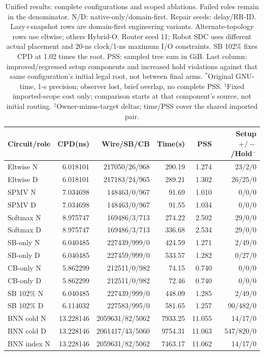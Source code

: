 \documentclass[conference,10pt]{IEEEtran}
\begin{document}
\begin{table}[t]
\centering\footnotesize\setlength{\tabcolsep}{3 pt}
\caption{Unified results: complete configurations and scoped ablations. Failed roles remain in the denominator. N/D: native-only/domain-first. Repair seeds: delay/RR-ID. Lazy+snapshot rows are domain-first engineering variants. Alternate-topology rows use eltwise; others Hybrid-O. Router seed 11; Robot SDC uses different actual placement and 20-ns clock/1-ns maximum I/O constraints. SB 102\% fixes CPD at 1.02 times the root. PSS: sampled tree sum in GiB. Last column: improved/regressed setup components and increased hold violations against that same configuration's initial legal root, not between final arms. $^{*}$Original GNU-time, 1-s precision; observer lost, brief overlap, no complete PSS. $^{\dagger}$Fixed imported-scope cost only; comparison starts at that component's source, not initial routing. $^{\ddagger}$Owner-minus-target deltas; time/PSS cover the shared imported pair.}
\label{tab:completecost}
\begin{tabular}{lrrrrr}\hline
Circuit/role & CPD(ns) & Wire/SB/CB & Time(s) & PSS & Setup $+/-$/Hold$^-$\\\hline
Eltwise N&6.018101&217050/26/968&290.19&1.274&23/2/0\\
Eltwise D&6.018101&217183/24/965&289.21&1.302&26/25/0\\
SPMV N&7.034698&148463/0/967&91.69&1.010&0/0/0\\
SPMV D&7.034698&148463/0/967&91.55&1.034&0/0/0\\
Softmax N&8.975747&169486/3/713&274.22&2.502&29/0/0\\
Softmax D&8.975747&169486/3/713&336.68&2.534&29/0/0\\
SB-only N&6.040485&227439/999/0&424.59&1.271&2/49/0\\
SB-only D&6.040485&227459/999/0&533.57&1.282&0/27/0\\
CB-only N&5.862299&212511/0/982&74.15&0.740&0/0/0\\
CB-only D&5.862299&212511/0/982&72.46&0.740&0/0/0\\
SB 102\% N&6.040485&227439/999/0&448.09&1.285&2/49/0\\
SB 102\% D&6.114032&227583/995/0&581.65&1.257&90/482/0\\
BNN cold N&13.228146&2059631/82/5062&7933.25&11.055&14/17/0\\
BNN cold D&13.228146&2061417/43/5060&9754.31&11.063&547/820/0\\
BNN index N&13.228146&2059631/82/5062&7463.17&11.062&14/17/0\\

\end{tabular}
\end{table}
\end{document}

